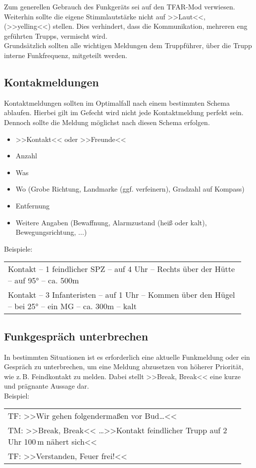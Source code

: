 	Zum generellen Gebrauch des Funkgeräts sei auf den TFAR-Mod verwiesen. Weiterhin sollte die eigene Stimmlautstärke nicht auf >>Laut<<, (>>yelling<<) stellen. Dies verhindert, dass die Kommunikation, mehreren eng geführten Trupps, vermischt wird.\\
	Grundsätzlich sollten alle wichtigen Meldungen dem Truppführer, über die Trupp interne Funkfrequenz, mitgeteilt werden.
 
\subsection{Kontakmeldungen}
	Kontaktmeldungen sollten im Optimalfall nach einem bestimmten Schema ablaufen. Hierbei gilt im Gefecht wird nicht jede Kontaktmeldung perfekt sein. Dennoch sollte die Meldung möglichst nach diesen Schema erfolgen.
	\begin{itemize}
		\setlength{\itemsep}{-4pt}
		\itemsep-4pt
		\item >>Kontakt<< oder >>Freunde<<
		\item Anzahl 
		\item Was
		\item Wo (Grobe Richtung, Landmarke (ggf. verfeinern), Gradzahl auf Kompass) 
		\item Entfernung
		\item Weitere Angaben (Bewaffnung, Alarmzustand (heiß oder kalt), Bewegungsrichtung, ...)
	\end{itemize}

	Beispiele:
	\begin{longtable}{P{0.95\linewidth}}
	\toprule
	Kontakt -- 1 feindlicher \acs{SPZ} -- auf 4 Uhr -- Rechts über der Hütte -- auf 95° -- ca. 500m\\
	\rcg Kontakt -- 3 Infanteristen -- auf 1 Uhr -- Kommen über den Hügel -- bei 25° -- ein \acs{MG} -- ca. 300m -- kalt\\
	\bottomrule
	\end{longtable}	
\subsection{Funkgespräch unterbrechen}
	In bestimmten Situationen ist es erforderlich eine aktuelle Funkmeldung oder ein Gespräch zu unterbrechen, um eine Meldung abzusetzen von höherer Priorität, wie z.\,B. Feindkontakt zu melden. Dabei stellt >>Break, Break<< eine kurze und prägnante Aussage dar.\\
	Beispiel:
	\begin{longtable}{P{0.95\linewidth}}
	\toprule
	TF: >>Wir gehen folgendermaßen vor Bud\dots<<\\
	\rcg TM: >>Break, Break<< \dots >>Kontakt feindlicher Trupp auf 2 Uhr 100\,m nähert sich<<\\
	TF: >>Verstanden, Feuer frei!<<\\
	\bottomrule
	\end{longtable}		

